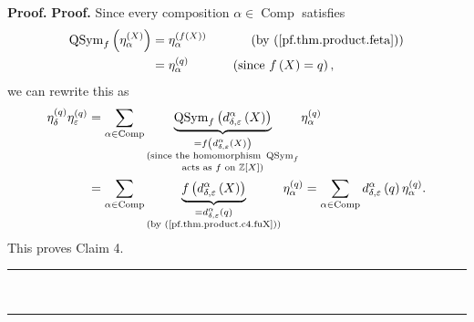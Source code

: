\documentclass[numbers=enddot,12pt,final,onecolumn,notitlepage]{scrartcl}%
\theoremstyle{definition}
\newenvironment{proof}[1][Proof]{\noindent\textbf{#1.} }{\ \rule{0.5em}{0.5em}}
\let\sumnonlimits\sum
\renewcommand{\sum}{\sumnonlimits\limits}
\begin{document}
\begin{proof}
\begin{proof}
Since every composition $\alpha\in\operatorname*{Comp}$ satisfies%
\begin{align*}
\operatorname*{QSym}\nolimits_{f}\left(  \eta_{\alpha}^{\left(  X\right)
}\right)   &  =\eta_{\alpha}^{\left(  f\left(  X\right)  \right)
}\ \ \ \ \ \ \ \ \ \ \left(  \text{by (\ref{pf.thm.product.feta})}\right) \\
&  =\eta_{\alpha}^{\left(  q\right)  }\ \ \ \ \ \ \ \ \ \ \left(  \text{since
}f\left(  X\right)  =q\right)  ,
\end{align*}
we can rewrite this as%
\begin{align*}
\eta_{\delta}^{\left(  q\right)  }\eta_{\varepsilon}^{\left(  q\right)  }  &
=\sum_{\alpha\in\operatorname*{Comp}}\underbrace{\operatorname*{QSym}%
\nolimits_{f}\left(  d_{\delta,\varepsilon}^{\alpha}\left(  X\right)  \right)
}_{\substack{=f\left(  d_{\delta,\varepsilon}^{\alpha}\left(  X\right)
\right)  \\\text{(since the homomorphism }\operatorname*{QSym}\nolimits_{f}%
\\\text{acts as }f\text{ on }\mathbb{Z}\left[  X\right]  \text{)}}%
}\eta_{\alpha}^{\left(  q\right)  }\\
&  =\sum_{\alpha\in\operatorname*{Comp}}\underbrace{f\left(  d_{\delta
,\varepsilon}^{\alpha}\left(  X\right)  \right)  }_{\substack{=d_{\delta
,\varepsilon}^{\alpha}\left(  q\right)  \\\text{(by
(\ref{pf.thm.product.c4.fuX}))}}}\eta_{\alpha}^{\left(  q\right)  }%
=\sum_{\alpha\in\operatorname*{Comp}}d_{\delta,\varepsilon}^{\alpha}\left(
q\right)  \eta_{\alpha}^{\left(  q\right)  }.
\end{align*}
This proves Claim 4.
\end{proof}


\end{proof}
\end{document}
